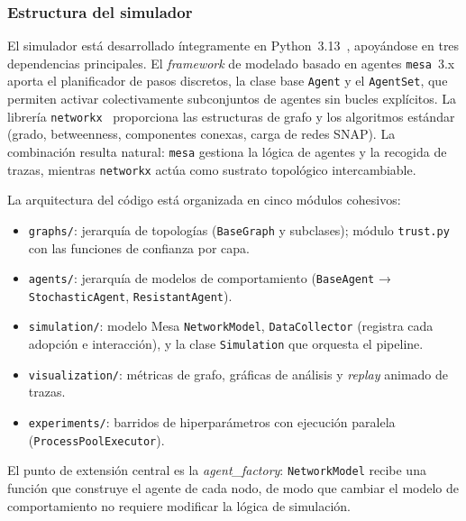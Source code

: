 \subsubsection{Estructura del simulador}

El simulador está desarrollado íntegramente en Python~3.13~\cite{PythonLang}, apoyándose en tres dependencias principales. El \emph{framework} de modelado basado en agentes \texttt{mesa}~3.x~\cite{Mesa3} aporta el planificador de pasos discretos, la clase base \texttt{Agent} y el \texttt{AgentSet}, que permiten activar colectivamente subconjuntos de agentes sin bucles explícitos. La librería \texttt{networkx}~\cite{NetworkX2008} proporciona las estructuras de grafo y los algoritmos estándar (grado, betweenness, componentes conexas, carga de redes SNAP). La combinación resulta natural: \texttt{mesa} gestiona la lógica de agentes y la recogida de trazas, mientras \texttt{networkx} actúa como sustrato topológico intercambiable.

La arquitectura del código está organizada en cinco módulos cohesivos:

\begin{itemize}[noitemsep]
  \item \texttt{graphs/}: jerarquía de topologías (\texttt{BaseGraph} y subclases); módulo \texttt{trust.py} con las funciones de confianza por capa.
  \item \texttt{agents/}: jerarquía de modelos de comportamiento (\texttt{BaseAgent} → \texttt{StochasticAgent}, \texttt{ResistantAgent}).
  \item \texttt{simulation/}: modelo Mesa \texttt{NetworkModel}, \texttt{DataCollector} (registra cada adopción e interacción), y la clase \texttt{Simulation} que orquesta el pipeline.
  \item \texttt{visualization/}: métricas de grafo, gráficas de análisis y \emph{replay} animado de trazas.
  \item \texttt{experiments/}: barridos de hiperparámetros con ejecución paralela (\texttt{ProcessPoolExecutor}).
\end{itemize}

El punto de extensión central es la \emph{agent\_factory}: \texttt{NetworkModel} recibe una función que construye el agente de cada nodo, de modo que cambiar el modelo de comportamiento no requiere modificar la lógica de simulación.


